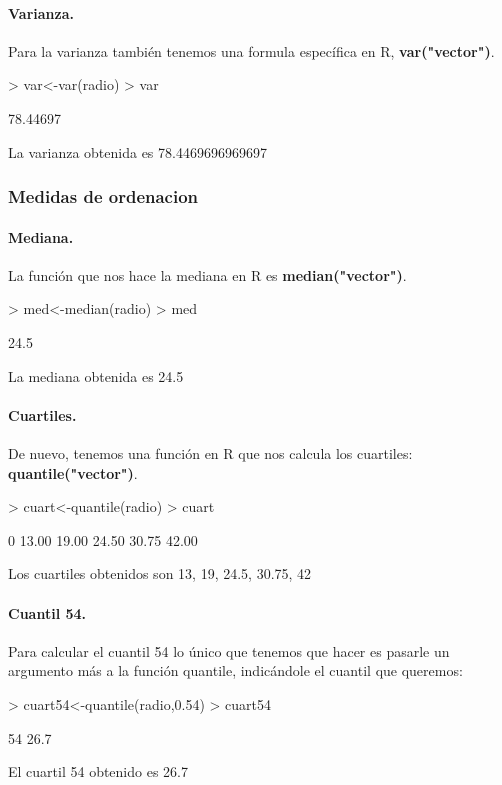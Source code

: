 \documentclass [a4paper] {article}
\begin{document}
\paragraph{Varianza.}
Para la varianza también tenemos una formula específica en R, \textbf{var("vector")}.
\begin{Schunk}
\begin{Sinput}
> var<-var(radio)
> var
\end{Sinput}
\begin{Soutput}
[1] 78.44697
\end{Soutput}
\end{Schunk}
La varianza obtenida es 78.4469696969697

\subsubsection{Medidas de ordenacion}
\paragraph{Mediana.}
La función que nos hace la mediana en R es \textbf{median("vector")}.
\begin{Schunk}
\begin{Sinput}
> med<-median(radio)
> med
\end{Sinput}
\begin{Soutput}
[1] 24.5
\end{Soutput}
\end{Schunk}
La mediana obtenida es 24.5

\paragraph{Cuartiles.}
De nuevo, tenemos una función en R que nos calcula los cuartiles: \textbf{quantile("vector")}.
\begin{Schunk}
\begin{Sinput}
> cuart<-quantile(radio)
> cuart
\end{Sinput}
\begin{Soutput}
   0%
13.00 19.00 24.50 30.75 42.00 
\end{Soutput}
\end{Schunk}
Los cuartiles obtenidos son 13, 19, 24.5, 30.75, 42

\paragraph{Cuantil 54.}
Para calcular el cuantil 54 lo único que tenemos que hacer es pasarle un argumento más a la función
quantile, indicándole el cuantil que queremos:
\begin{Schunk}
\begin{Sinput}
> cuart54<-quantile(radio,0.54)
> cuart54
\end{Sinput}
\begin{Soutput}
 54%
26.7 
\end{Soutput}
\end{Schunk}
El cuartil 54 obtenido es 26.7
\end{document}

